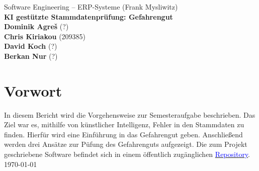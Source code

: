 \begin{titlepage}
    \begin{flushleft}
        Software Engineering -- ERP-Systeme (Frank Mysliwitz)\\
        \huge
        \textbf{KI gestützte Stammdatenprüfung: Gefahrengut}\\
        \vspace{1,5cm}
        \Large
        \textbf{Dominik Agreš} {\small (?)}\\
        \textbf{Chris Kiriakou} {\small (209385)}\\
        \textbf{David Koch} {\small (?)}\\
        \textbf{Berkan Nur} {\small (?)}\\
        \vspace{1,5cm}
        \large
        \section*{Vorwort}
        In diesem Bericht wird die Vorgehensweise zur Semesteraufgabe beschrieben.
        Das Ziel war es, mithilfe von künstlicher Intelligenz, Fehler in den Stammdaten zu
        finden. Hierfür wird eine Einführung in das Gefahrengut geben. Anschließend werden
        drei Ansätze zur Püfung des Gefahrenguts aufgezeigt. 
        Die zum Projekt geschriebene Software befindet sich in einem öffentlich 
        zugänglichen \href{https://github.com/ckiri/wetterstation}{\textcolor{blue}{Repository}}.\\
        \vspace{2,5cm}
        \today \\
        \vspace{3,5cm}
    \end{flushleft}
\end{titlepage}
